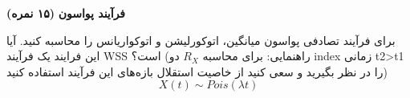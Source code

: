\Large \textbf{فرآیند پواسون}
\large \textbf{(۱۵ نمره)}

\normalsize \vspace{0.5cm}
برای فرآیند تصادفی پواسون میانگین، اتوکورلیشن و اتوکواریانس را محاسبه کنید. آیا این فرایند یک فرآیند WSS است؟
(راهنمایی: برای محاسبه $ R_X $ دو index زمانی t2>t1 را در نظر بگیرید و سعی کنید از خاصیت استقلال بازه‌های این فرآیند استفاده کنید)
$$
 X(t) \sim Pois(\lambda t) 
$$

